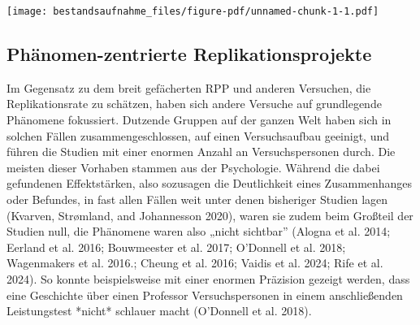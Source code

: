 \documentclass[
  letterpaper,
  DIV=11,
  numbers=noendperiod]{scrreprt}
\newenvironment{Shaded}{\begin{snugshade}}{\end{snugshade}}
\newcommand{\AttributeTok}[1]{\textcolor[rgb]{0.40,0.45,0.13}{#1}}
\newcommand{\DecValTok}[1]{\textcolor[rgb]{0.68,0.00,0.00}{#1}}
\newcommand{\FunctionTok}[1]{\textcolor[rgb]{0.28,0.35,0.67}{#1}}
\newcommand{\NormalTok}[1]{\textcolor[rgb]{0.00,0.23,0.31}{#1}}
\newcommand{\SpecialCharTok}[1]{\textcolor[rgb]{0.37,0.37,0.37}{#1}}
\newcommand{\StringTok}[1]{\textcolor[rgb]{0.13,0.47,0.30}{#1}}
\begin{document}
\begin{Shaded}
\end{Shaded}

\texttt{[image: bestandsaufnahme\_files/figure-pdf/unnamed-chunk-1-1.pdf]}

\subsection{Phänomen-zentrierte
Replikationsprojekte}\label{phuxe4nomen-zentrierte-replikationsprojekte}

Im Gegensatz zu dem breit gefächerten RPP und anderen Versuchen, die
Replikationsrate zu schätzen, haben sich andere Versuche auf
grundlegende Phänomene fokussiert. Dutzende Gruppen auf der ganzen Welt
haben sich in solchen Fällen zusammengeschlossen, auf einen
Versuchsaufbau geeinigt, und führen die Studien mit einer enormen Anzahl
an Versuchspersonen durch. Die meisten dieser Vorhaben stammen aus der
Psychologie. Während die dabei gefundenen Effektstärken, also sozusagen
die Deutlichkeit eines Zusammenhanges oder Befundes, in fast allen
Fällen weit unter denen bisheriger Studien lagen (Kvarven, Strømland,
and Johannesson 2020), waren sie zudem beim Großteil der Studien null,
die Phänomene waren also „nicht sichtbar'' (Alogna et al. 2014; Eerland
et al. 2016; Bouwmeester et al. 2017; O'Donnell et al. 2018; Wagenmakers
et al. 2016.; Cheung et al. 2016; Vaidis et al. 2024; Rife et al. 2024).
So konnte beispielsweise mit einer enormen Präzision gezeigt werden,
dass eine Geschichte über einen Professor Versuchspersonen in einem
anschließenden Leistungstest *nicht* schlauer macht (O'Donnell et al.
2018).
\end{document}
